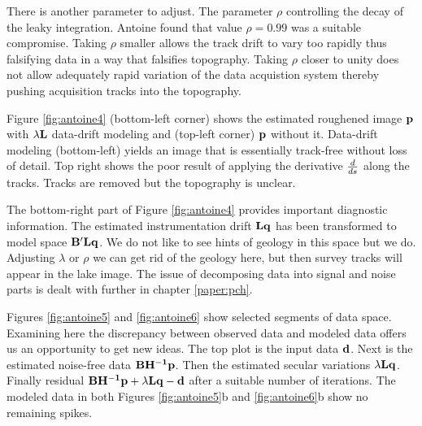 \par
There is another parameter to adjust.
The parameter $\rho$ controlling the decay of the leaky integration. 
Antoine found that value ${\rho=0.99}$ was a suitable compromise.
Taking $\rho$ smaller allows the track drift to vary too rapidly thus
falsifying data in a way that falsifies topography.
Taking $\rho$ closer to unity does not allow adequately rapid variation
of the data acquistion system
thereby pushing acquisition tracks into the topography.

\par
Figure \ref{fig:antoine4}
(bottom-left corner)
shows the estimated roughened image ${\bf p}$
with $\lambda\bold L$ data-drift modeling and
(top-left corner) ${\bf p}$ without it.
Data-drift modeling (bottom-left)
yields an image that is essentially track-free without loss of detail.
Top right shows the poor result of applying 
the derivative $d \over ds$ along the tracks.
Tracks are removed but the topography is unclear.

\par
The bottom-right part of
Figure \ref{fig:antoine4} provides important diagnostic information.
The estimated instrumentation drift $\bold L\bold q$ has been transformed
to model space $\bold B'\bold L\bold q$.
We do not like to see hints of geology in this space but we do.
Adjusting $\lambda$ or $\rho$ we can get rid of the geology here,
but then survey tracks will appear in the lake image.
The issue of decomposing data into signal and noise parts
is dealt with further in chapter \ref{paper:pch}.

\par
Figures \ref{fig:antoine5} and \ref{fig:antoine6} show
selected segments of data space.
Examining here the discrepancy between observed data and modeled data
offers us an opportunity to get new ideas.
The top plot is the input data $\bold{d}$.
Next is the estimated noise-free data ${\bf BH^{-1}p}$.
Then the estimated secular variations $\lambda \bold L \bold q$.
Finally residual
$\bold B \bold {H^{-1}} \bold p + \lambda \bold L \bold q - \bold d$
after a suitable number of iterations.
The modeled data in both Figures \ref{fig:antoine5}b and 
\ref{fig:antoine6}b show no remaining spikes.

